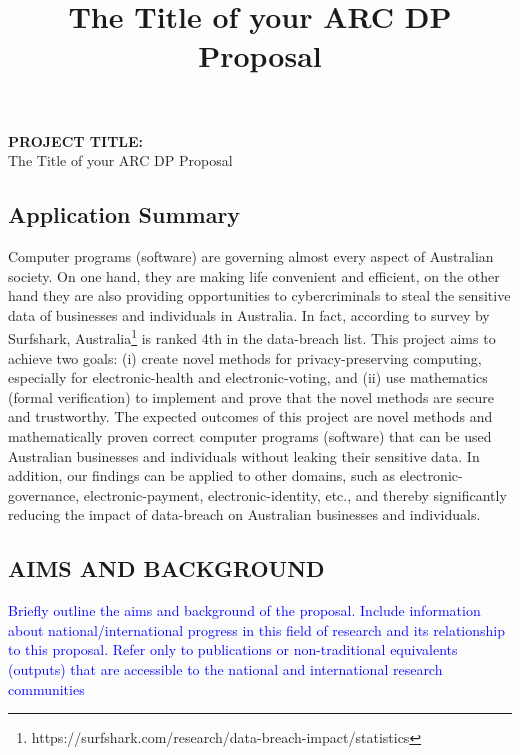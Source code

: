 \documentclass[12pt,a4paper]{article}
\date{}
\title{The Title of your ARC DP Proposal}
\date{} %
\newcommand{\rules}[1]{\textcolor{blue}{#1}}
\newcommand*{\TitleFont}{%
      \usefont{\encodingdefault}{\rmdefault}{b}{n}%
      \fontsize{12}{12}%
      \selectfont}
\begin{document}
\rmfamily
\date{}


\noindent \textbf{PROJECT TITLE: }\\ \noindent The Title of your ARC DP Proposal





\subsection*{Application Summary}
Computer programs (software) are governing almost every aspect of Australian society. 
On one hand, they are making life convenient and efficient, on the other hand they 
are also providing opportunities to cybercriminals to steal the sensitive data of 
businesses and individuals in Australia. In fact, according to survey by Surfshark, 
Australia\footnote{https://surfshark.com/research/data-breach-impact/statistics}
is ranked 4th in the data-breach list. This project aims to achieve two goals: 
(i) create novel methods for privacy-preserving computing,
especially for electronic-health and electronic-voting, 
and (ii) use mathematics (formal verification) to implement and prove that the 
novel methods are secure and trustworthy.
The expected outcomes of this project are novel methods and 
mathematically proven correct computer programs (software) that can be 
used Australian businesses and individuals without leaking their 
sensitive data. In addition, 
our findings can be applied to other domains, such as 
electronic-governance, electronic-payment, electronic-identity, etc., 
and thereby significantly reducing the impact of data-breach on 
Australian businesses and individuals. 






\subsection*{\TitleFont AIMS AND BACKGROUND}
\rules{ Briefly outline the aims and background of the proposal.  Include information about 
national/international progress in this field of research and its relationship to this 
proposal. Refer only to publications or non-traditional equivalents (outputs) that are accessible 
to the national and international research communities }
\end{document}
